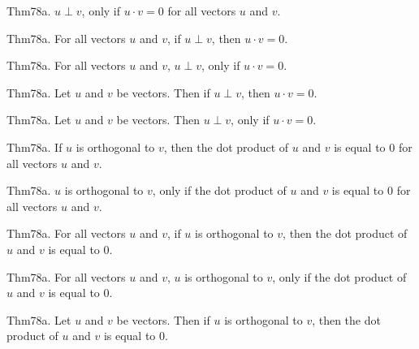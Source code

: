 \documentclass{article}
\begin{document}
Thm78a. $u \perp v$, only if $u \cdot v = 0$ for all vectors $u$ and $v$.

Thm78a. For all vectors $u$ and $v$, if $u \perp v$, then $u \cdot v = 0$.

Thm78a. For all vectors $u$ and $v$, $u \perp v$, only if $u \cdot v = 0$.

Thm78a. Let $u$ and $v$ be vectors. Then if $u \perp v$, then $u \cdot v = 0$.

Thm78a. Let $u$ and $v$ be vectors. Then $u \perp v$, only if $u \cdot v = 0$.

Thm78a. If $u$ is orthogonal to $v$, then the dot product of $u$ and $v$ is equal to $0$ for all vectors $u$ and $v$.

Thm78a. $u$ is orthogonal to $v$, only if the dot product of $u$ and $v$ is equal to $0$ for all vectors $u$ and $v$.

Thm78a. For all vectors $u$ and $v$, if $u$ is orthogonal to $v$, then the dot product of $u$ and $v$ is equal to $0$.

Thm78a. For all vectors $u$ and $v$, $u$ is orthogonal to $v$, only if the dot product of $u$ and $v$ is equal to $0$.

Thm78a. Let $u$ and $v$ be vectors. Then if $u$ is orthogonal to $v$, then the dot product of $u$ and $v$ is equal to $0$.
\end{document}
